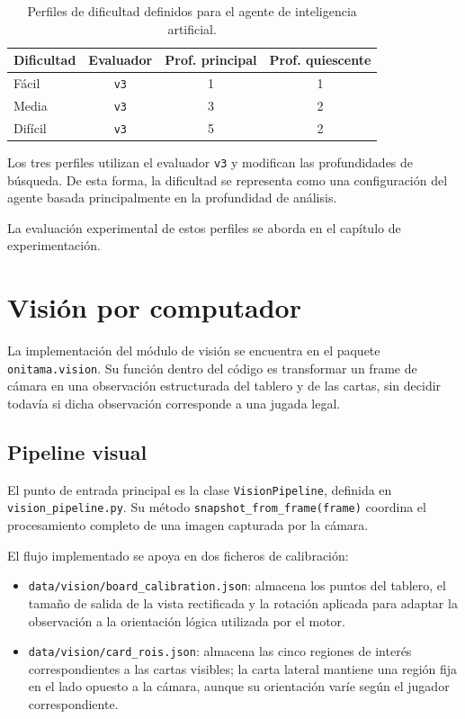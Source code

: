 \begin{table}[H]
\centering
\begin{tabular}{l c c c}
\hline
\textbf{Dificultad} & \textbf{Evaluador} & \textbf{Prof. principal} & \textbf{Prof. quiescente} \\
\hline
Fácil & \texttt{v3} & 1 & 1 \\
Media & \texttt{v3} & 3 & 2 \\
Difícil & \texttt{v3} & 5 & 2 \\
\hline
\end{tabular}
\caption{Perfiles de dificultad definidos para el agente de inteligencia artificial.}
\label{tab:perfiles-dificultad-ia}
\end{table}

Los tres perfiles utilizan el evaluador \texttt{v3} y modifican las profundidades de búsqueda. De esta forma, la dificultad se representa como una configuración del agente basada principalmente en la profundidad de análisis.

La evaluación experimental de estos perfiles se aborda en el capítulo de experimentación.


\section{Visión por computador}
\label{sec:vision-computador}

La implementación del módulo de visión se encuentra en el paquete \texttt{onitama.vision}. Su función dentro del código es transformar un frame de cámara en una observación estructurada del tablero y de las cartas, sin decidir todavía si dicha observación corresponde a una jugada legal.

\subsection{Pipeline visual}
\label{subsec:pipeline-visual}

El punto de entrada principal es la clase \texttt{VisionPipeline}, definida en \texttt{vision\_pipeline.py}. Su método \texttt{snapshot\_from\_frame(frame)} coordina el procesamiento completo de una imagen capturada por la cámara.

El flujo implementado se apoya en dos ficheros de calibración:

\begin{itemize}
    \item \texttt{data/vision/board\_calibration.json}: almacena los puntos del tablero, el tamaño de salida de la vista rectificada y la rotación aplicada para adaptar la observación a la orientación lógica utilizada por el motor.

    \item \texttt{data/vision/card\_rois.json}: almacena las cinco regiones de interés correspondientes a las cartas visibles; la carta lateral mantiene una región fija en el lado opuesto a la cámara, aunque su orientación varíe según el jugador correspondiente.
\end{itemize}

